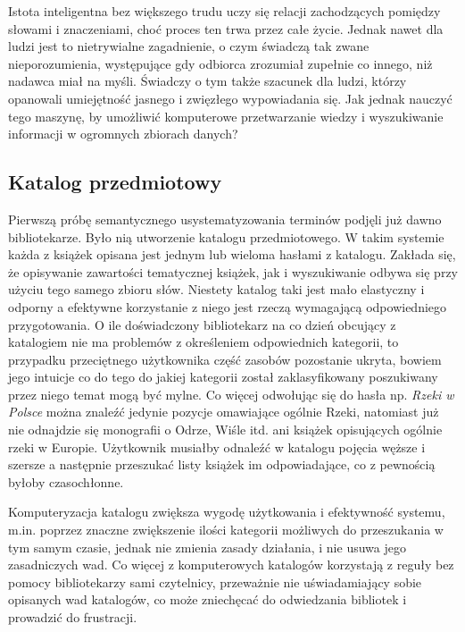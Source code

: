 Istota inteligentna bez większego trudu uczy się relacji zachodzących pomiędzy słowami i znaczeniami, choć proces ten trwa przez całe życie. Jednak nawet dla ludzi jest to nietrywialne zagadnienie, o czym świadczą tak zwane nieporozumienia, występujące gdy odbiorca zrozumiał zupełnie co innego, niż nadawca miał na myśli. Świadczy o tym także szacunek dla ludzi, którzy opanowali umiejętność jasnego i zwięzłego wypowiadania się. Jak jednak nauczyć tego maszynę, by umożliwić komputerowe przetwarzanie wiedzy i wyszukiwanie informacji w ogromnych zbiorach danych?

\subsection{Katalog przedmiotowy}
Pierwszą próbę semantycznego usystematyzowania terminów podjęli już dawno bibliotekarze. Było nią utworzenie katalogu przedmiotowego. W takim systemie każda z książek opisana jest jednym lub wieloma hasłami z katalogu. Zakłada się, że opisywanie zawartości tematycznej książek, jak i wyszukiwanie odbywa się przy użyciu tego samego zbioru słów. Niestety katalog taki jest mało elastyczny i odporny a efektywne korzystanie z niego jest rzeczą wymagającą odpowiedniego przygotowania. O ile doświadczony bibliotekarz na co dzień obcujący z katalogiem nie ma problemów z określeniem odpowiednich kategorii, to przypadku przeciętnego użytkownika część zasobów pozostanie ukryta, bowiem jego intuicje co do tego do jakiej kategorii został zaklasyfikowany poszukiwany przez niego temat mogą być mylne. Co więcej odwołując się do hasła np. \textit{Rzeki w Polsce} można znaleźć jedynie pozycje omawiające ogólnie Rzeki, natomiast już nie odnajdzie się monografii o Odrze, Wiśle itd. ani książek opisujących ogólnie rzeki w Europie. Użytkownik musiałby odnaleźć w katalogu pojęcia węższe i szersze a następnie przeszukać listy książek im odpowiadające, co z pewnością byłoby czasochłonne.  

Komputeryzacja katalogu zwiększa wygodę użytkowania i efektywność systemu, m.in. poprzez znaczne zwiększenie ilości kategorii możliwych do przeszukania w tym samym czasie, jednak nie zmienia zasady działania, i nie usuwa jego zasadniczych wad. Co więcej z komputerowych katalogów korzystają z reguły bez pomocy bibliotekarzy sami czytelnicy, przeważnie nie uświadamiający sobie opisanych wad katalogów, co może zniechęcać do odwiedzania bibliotek i prowadzić do frustracji.
